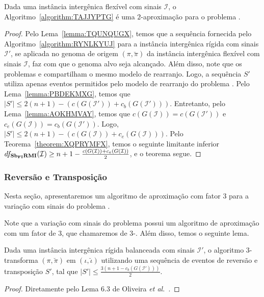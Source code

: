 \begin{theorem}\label{theorem:PQWPQJDG}
Dada uma instância intergênica flexível com sinais $\mathcal{I}$, o Algoritmo~\ref{algorithm:TAJJYPTG} é uma $2$-aproximação para o problema \SbFIRMI{}.
\end{theorem}
\begin{proof}
Pelo Lema~\ref{lemma:TQUNQUGX}, temos que a sequência fornecida pelo Algoritmo~\ref{algorithm:RYNLKYUJ} para a instância intergênica rígida com sinais $\mathcal{I'}$, se aplicada no genoma de origem $(\pi,\breve\pi)$ da instância intergênica flexível com sinais $\mathcal{I}$, faz com que o genoma alvo seja alcançado. Além disso, note que os problemas \SbIRMI{} e \SbFIRMI{} compartilham o mesmo modelo de rearranjo. Logo, a sequência $S'$ utiliza apenas eventos permitidos pelo modelo de rearranjo do problema \SbFIRMI{}. Pelo Lema~\ref{lemma:PBDEKMXG}, temos que $|S'| \le 2(n + 1) - (c(G(\mathcal{I}')) + c_b(G(\mathcal{I}')))$. Entretanto, pelo Lema~\ref{lemma:AOKHMVAY}, temos que $c(G(\mathcal{I})) = c(G(\mathcal{I}'))$ e $c_e(G(\mathcal{I})) = c_b(G(\mathcal{I}'))$. Logo, $|S'| \le 2(n + 1) - (c(G(\mathcal{I})) + c_e(G(\mathcal{I})))$. Pelo Teorema~\ref{theorem:XQPRYMFX}, temos o seguinte limitante inferior $df_{\textbf{Sb\textsubscript{FI}RMI}}(\mathcal{I}) \ge {n+1} - \frac{c(G(\mathcal{I})) + c_e(G(\mathcal{I}))}{2}$, e o teorema segue.
\end{proof}

\subsubsection{Reversão e Transposição}

Nesta seção, apresentaremos um algoritmo de aproximação com fator $3$ para a variação com sinais do problema \SbFIRT{}. 

Note que a variação com sinais do problema \SbIRT{} possui um algoritmo de aproximação com um fator de $3$, que chamaremos de $3$-\SbIRT{}. Além disso, temos o seguinte lema.

\begin{lemma}\label{lemma:MNQTVIRT}
Dada uma instância intergênica rígida balanceada com sinais $\mathcal{I}'$, o algoritmo $3$-\SbIRT{} transforma $(\pi,\breve\pi)$ em $(\iota,\breve\iota)$ utilizando uma sequência de eventos de reversão e transposição $S'$, tal que $|S'| \le \frac{3({n+1} - c_b(G(\mathcal{I}')))}{2}$.
\end{lemma}
\begin{proof}
Diretamente pelo Lema 6.3 de Oliveira \textit{et al.}~\cite{2021a-oliveira-etal}.
\end{proof}

